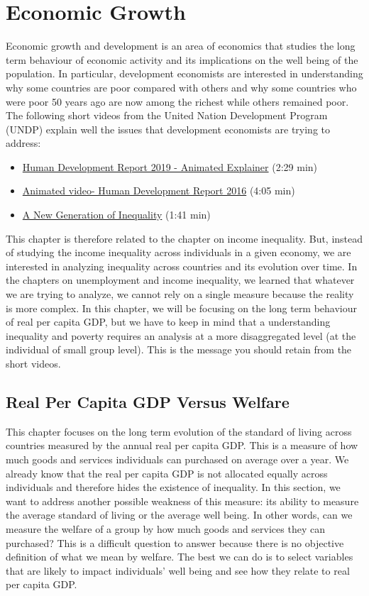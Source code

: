 \documentclass[letterpaper]{article}\usepackage[]{graphicx}\usepackage[]{color}
\numberwithin{exer}{section}
\theoremstyle{nonumberplain}
\begin{document}
\section{Economic Growth}
Economic growth and development is an area of economics that studies
the long term behaviour of economic activity and its implications on
the well being of the population. In particular, development
economists are interested in understanding why some countries are poor
compared with others and why some countries who were poor 50 years ago
are now among the richest while others remained poor. The following
short videos from the United Nation Development Program (UNDP) explain
well the issues that development economists are trying to address:
\begin{itemize}
\item \href{https://youtu.be/hUsrRwe9r04}{Human Development Report 2019 - Animated Explainer} (2:29 min)
\item \href{https://youtu.be/4KIoYPyCJMo}{Animated video- Human Development Report 2016} (4:05 min)
\item \href{https://youtu.be/P0o_MSOIv1k}{A New Generation of Inequality} (1:41 min)
  \end{itemize}
This chapter is therefore related to the chapter on income
inequality. But, instead of studying the income inequality across
individuals in a given economy, we are interested in analyzing
inequality across countries and its evolution over time. In the
chapters on unemployment and income inequality, we learned that
whatever we are trying to analyze, we cannot rely on a single measure
because the reality is more complex. In this chapter,  we will be
focusing on the long term behaviour of real per capita GDP, but we
have to keep in mind that a understanding inequality and poverty
requires an analysis at a more disaggregated level (at the individual
of small group level). This is the message you should retain from the
short videos. 



\subsection{Real Per Capita GDP Versus Welfare}

This chapter focuses on the long term evolution of the standard of
living across countries measured by the annual real per capita
GDP. This is a measure of how much goods and services individuals can
purchased on average over a year. We already know that the real per
capita GDP is not allocated equally across individuals and therefore
hides the existence of inequality. In this section, we want to address
another possible weakness of this measure: its ability to measure the
average standard of living or the average well being. In other words,
can we measure the welfare of a group by how much goods and services
they can purchased? This is a difficult question to answer because
there is no objective definition of what we mean by welfare. The best
we can do is to select variables that are likely to impact
individuals' well being and see how they relate to real per capita
GDP.
\end{document}
